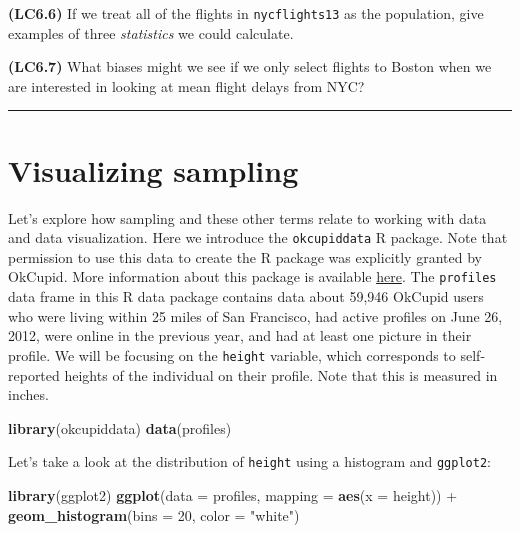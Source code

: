 \documentclass[]{tufte-book}
\newenvironment{Shaded}{\begin{snugshade}}{\end{snugshade}}
\newcommand{\KeywordTok}[1]{\textcolor[rgb]{0.13,0.29,0.53}{\textbf{{#1}}}}
\newcommand{\DataTypeTok}[1]{\textcolor[rgb]{0.13,0.29,0.53}{{#1}}}
\newcommand{\DecValTok}[1]{\textcolor[rgb]{0.00,0.00,0.81}{{#1}}}
\newcommand{\StringTok}[1]{\textcolor[rgb]{0.31,0.60,0.02}{{#1}}}
\newcommand{\NormalTok}[1]{{#1}}
\let\oldrule=\rule
\renewcommand{\rule}[1]{\oldrule{\linewidth}}
\begin{document}
\textbf{(LC6.6)} If we treat all of the flights in \texttt{nycflights13}
as the population, give examples of three \emph{statistics} we could
calculate.

\textbf{(LC6.7)} What biases might we see if we only select flights to
Boston when we are interested in looking at mean flight delays from NYC?

\begin{center}\rule{0.5\linewidth}{\linethickness}\end{center}

\section{Visualizing sampling}\label{visualizing-sampling}

Let's explore how sampling and these other terms relate to working with
data and data visualization. Here we introduce the \texttt{okcupiddata}
R package. Note that permission to use this data to create the R package
was explicitly granted by OkCupid. More information about this package
is available \href{https://github.com/rudeboybert/okcupiddata}{here}.
The \texttt{profiles} data frame in this R data package contains data
about 59,946 OkCupid users who were living within 25 miles of San
Francisco, had active profiles on June 26, 2012, were online in the
previous year, and had at least one picture in their profile. We will be
focusing on the \texttt{height} variable, which corresponds to
self-reported heights of the individual on their profile. Note that this
is measured in inches.

\begin{Shaded}
\begin{Highlighting}[]
\KeywordTok{library}\NormalTok{(okcupiddata)}
\KeywordTok{data}\NormalTok{(profiles)}
\end{Highlighting}
\end{Shaded}

Let's take a look at the distribution of \texttt{height} using a
histogram and \texttt{ggplot2}:

\begin{Shaded}
\begin{Highlighting}[]
\KeywordTok{library}\NormalTok{(ggplot2)}
\KeywordTok{ggplot}\NormalTok{(}\DataTypeTok{data =} \NormalTok{profiles, }\DataTypeTok{mapping =} \KeywordTok{aes}\NormalTok{(}\DataTypeTok{x =} \NormalTok{height)) +}
\StringTok{  }\KeywordTok{geom_histogram}\NormalTok{(}\DataTypeTok{bins =} \DecValTok{20}\NormalTok{, }\DataTypeTok{color =} \StringTok{"white"}\NormalTok{)}
\end{Highlighting}
\end{Shaded}
\end{document}
